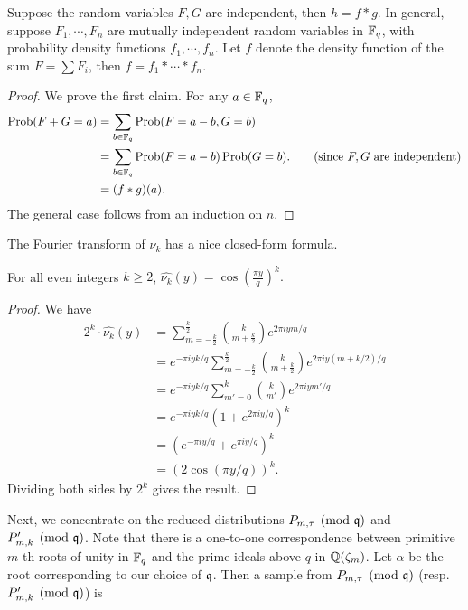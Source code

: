 \documentclass{amsart}
\begin{document}
\begin{Lemma}
Suppose the random variables $F,G$ are independent, then $h =  f \ast g$.
In general, suppose $F_1, \cdots, F_n$ are mutually independent random variables in $\mathbb{F}_q$, with probability density functions $f_1, \cdots, f_n$. Let $f$ denote the density function of the sum $F = \sum F_i$, then $f = f_1 \ast \cdots \ast f_n$.
\end{Lemma}

\begin{proof}
We prove the first claim. For any $a \in \mathbb{F}_q$,
\begin{align*}
\operatorname{Prob}(F+G = a) &= \sum_{b \in \mathbb{F}_q} \operatorname{Prob}(F = a-b, G =b) \\
& = \sum_{b \in \mathbb{F}_q} \operatorname{Prob}(F = a-b)\operatorname{Prob}(G =b).  \qquad \mbox{(since $F,G$ are independent)} \\
& = (f \ast g)(a).
\end{align*}
The general case follows from an induction on $n$.
\end{proof}

The Fourier transform of $\nu_k$ has a nice closed-form formula.
\begin{Lemma}
\label{lem: transform1}
For all even integers $k \geq 2$, $\widehat{\nu_k}(y)  = \cos \left(\frac{\pi y}{q}\right)^k.$
\end{Lemma}

\begin{proof}  We have
\begin{align*}
2^k \cdot \widehat{\nu_k}(y) &= \sum_{m = -\frac{k}{2}}^{\frac{k}{2}} {k \choose m+\frac{k}{2}} e^{2\pi i ym/q}  \\
&= e^{-\pi i yk/q}\sum_{m = -\frac{k}{2}}^{\frac{k}{2}} {k \choose m+\frac{k}{2}} e^{2\pi i y(m+k/2)/q} \\
&= e^{-\pi i yk/q} \sum_{m' = 0}^{k} {k \choose m'} e^{2\pi i ym'/q} \\
& =  e^{-\pi i yk/q} (1+ e^{2 \pi i y/q})^k \\
& = (e^{-\pi i y/q} + e^{\pi i y/q})^k  \\
& = (2 \cos(\pi y/q))^k.
\end{align*}
Dividing both sides by $2^k$ gives the result.
\end{proof}


Next, we concentrate on the reduced distributions $P_{m,\tau} \pmod{\mathfrak{q}}$ and $P'_{m,k} \pmod {\mathfrak{q}}$. Note that there is a one-to-one correspondence between primitive $m$-th roots of unity in $\mathbb{F}_q$ and the prime ideals above $q$ in $\mathbb{Q}(\zeta_m)$. Let $\alpha$ be the root corresponding to our choice of $\mathfrak{q}$. Then a sample from $P_{m, \tau} \pmod{\mathfrak{q}}$ (resp. $P'_{m,k} \pmod {\mathfrak{q}}$) is
\end{document}
